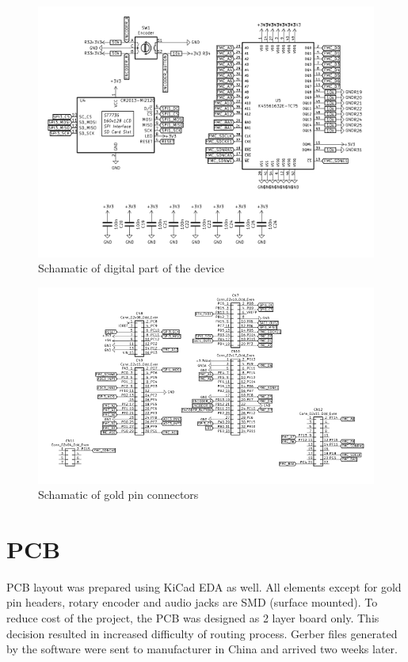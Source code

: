 \documentclass[a4paper,twoside,12pt]{book}
\begin{document}
\begin{figure}[H]
    \centering
    \includegraphics[width=\textwidth]{images/Schematic_digital}
    \caption{Schamatic of digital part of the device}
    \label{fig:Schematic2}
\end{figure}

\begin{figure}[H]
    \centering
    \includegraphics[width=\textwidth]{images/Schematic_connectors}
    \caption{Schamatic of gold pin connectors}
    \label{fig:Schematic3}
\end{figure}

\section{PCB}
PCB layout was prepared using KiCad EDA as well.
All elements except for gold pin headers,
rotary encoder and audio jacks are SMD (surface mounted).
To reduce cost of the project, the PCB was designed as 2 layer board only.
This decision resulted in increased difficulty of routing process.
Gerber files generated by the software were sent to manufacturer in China
and arrived two weeks later.
\end{document}
